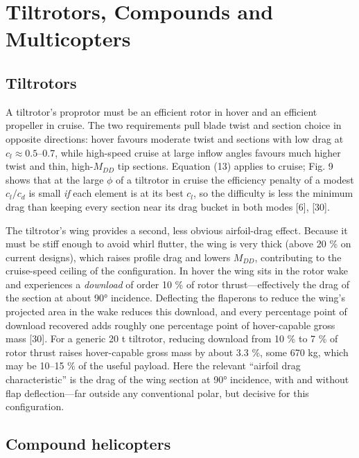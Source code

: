 \documentclass[10pt,a4paper,twocolumn]{article}
\begin{document}
\hypertarget{tiltrotors-compounds-and-multicopters}{%
\section{Tiltrotors, Compounds and
Multicopters}\label{tiltrotors-compounds-and-multicopters}}

\hypertarget{tiltrotors}{%
\subsection{Tiltrotors}\label{tiltrotors}}

A tiltrotor's proprotor must be an efficient rotor in hover and an
efficient propeller in cruise. The two requirements pull blade twist and
section choice in opposite directions: hover favours moderate twist and
sections with low drag at \(c_l\approx0.5\)--0.7, while high-speed
cruise at large inflow angles favours much higher twist and thin,
high-\(M_{DD}\) tip sections. Equation (13) applies to cruise; Fig. 9
shows that at the large \(\phi\) of a tiltrotor in cruise the efficiency
penalty of a modest \(c_l/c_d\) is small \emph{if} each element is at
its best \(c_l\), so the difficulty is less the minimum drag than
keeping every section near its drag bucket in both modes {[}6{]},
{[}30{]}.

The tiltrotor's wing provides a second, less obvious airfoil-drag
effect. Because it must be stiff enough to avoid whirl flutter, the wing
is very thick (above 20 \% on current designs), which raises profile
drag and lowers \(M_{DD}\), contributing to the cruise-speed ceiling of
the configuration. In hover the wing sits in the rotor wake and
experiences a \emph{download} of order 10 \% of rotor
thrust---effectively the drag of the section at about 90° incidence.
Deflecting the flaperons to reduce the wing's projected area in the wake
reduces this download, and every percentage point of download recovered
adds roughly one percentage point of hover-capable gross mass {[}30{]}.
For a generic 20 t tiltrotor, reducing download from 10 \% to 7 \% of
rotor thrust raises hover-capable gross mass by about 3.3 \%, some 670
kg, which may be 10--15 \% of the useful payload. Here the relevant
``airfoil drag characteristic'' is the drag of the wing section at 90°
incidence, with and without flap deflection---far outside any
conventional polar, but decisive for this configuration.

\hypertarget{compound-helicopters}{%
\subsection{Compound helicopters}\label{compound-helicopters}}
\end{document}
